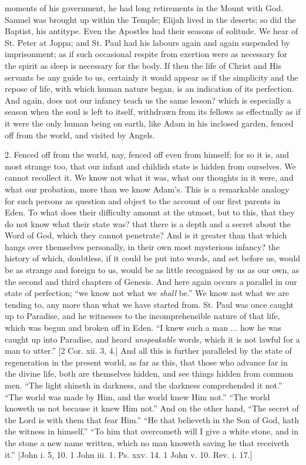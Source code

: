 moments of his government, he had long retirements in the Mount with
God. Samuel was brought up within the Temple; Elijah lived in the
deserts; so did the Baptist, his antitype. Even the Apostles had their
seasons of solitude. We hear of St. Peter at Joppa; and St. Paul had
his labours again and again suspended by imprisonment; as if such
occasional respite from exertion were as necessary for the spirit as
sleep is necessary for the body. If then the life of Christ and His
servants be any guide to us, certainly it would appear as if the
simplicity and the repose of life, with which human nature began, is
an indication of its perfection. And again, does not our infancy teach
us the same lesson? which is especially a season when the soul is left
to itself, withdrawn from its fellows as effectually as if it were the
only human being on earth, like Adam in his inclosed garden, fenced
off from the world, and visited by Angels.

2. Fenced off from the world, nay, fenced off even from himself;
for so it is, and most strange too, that our infant and childish state
is hidden from ourselves. We cannot recollect it. We know not what it
was, what our thoughts in it were, and what our probation, more than
we know Adam's. This is a remarkable analogy for such persons as
question and object to the account of our first parents in Eden. To
what does their difficulty amount at the utmost, but to this, that
they do not know what their state was? that there is a depth and a
secret about the Word of God, which they cannot penetrate? And is it
greater than that which hangs over themselves personally, in their own
most mysterious infancy? the history of which, doubtless, if it could
be put into words, and set before us, would be as strange and foreign
to us, would be as little recognised by us as our own, as the second
and third chapters of Genesis. And here again occurs a parallel in our
state of perfection; ``we know not what we \emph{shall} be.''
We know not what we are tending to, any more than what we have started
from. St. Paul was once caught up to Paradise, and he witnesses to the
incomprehensible nature of that life, which was begun and broken off
in Eden. ``I knew such a man ... how he was caught up into
Paradise, and heard \emph{unspeakable} words, which it is not lawful
for a man to utter.'' [2 Cor. xii. 3, 4.] And all this is further
paralleled by the state of regeneration in the present world, as far
as this, that those who advance far in the divine life, both are
themselves hidden, and see things hidden from common men. ``The
light shineth in darkness, and the darkness comprehended it not.''
``The world was made by Him, and the world knew Him not.''
``The world knoweth us not because it knew Him not.'' And on
the other hand, ``The secret of the Lord is with them that fear
Him.'' ``He that believeth in the Son of God, hath the witness
in himself.'' ``To him that overcometh will I give a white
stone, and in the stone a new name written, which no man knoweth
saving he that receiveth it.'' [John i. 5, 10. 1 John iii. 1. Ps.
xxv. 14. 1 John v. 10. Rev. i. 17.]

